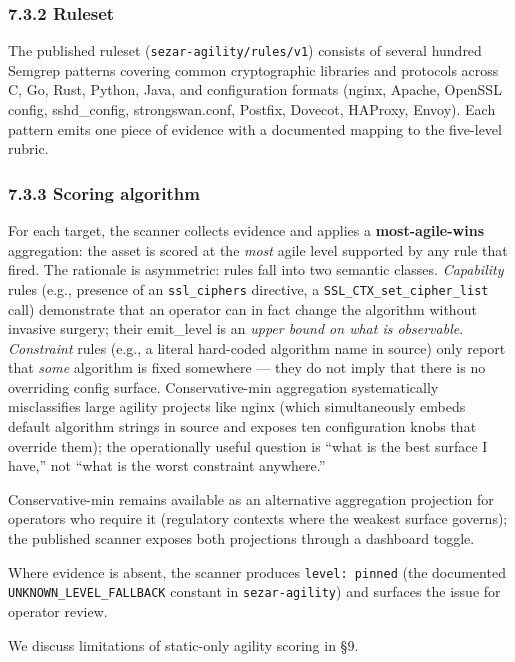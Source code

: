 \subsubsection{7.3.2 Ruleset}\label{ruleset}

The published ruleset (\texttt{sezar-agility/rules/v1}) consists of
several hundred Semgrep patterns covering common cryptographic libraries
and protocols across C, Go, Rust, Python, Java, and configuration
formats (nginx, Apache, OpenSSL config, sshd\_config, strongswan.conf,
Postfix, Dovecot, HAProxy, Envoy). Each pattern emits one piece of
evidence with a documented mapping to the five-level rubric.

\subsubsection{7.3.3 Scoring algorithm}\label{scoring-algorithm}

For each target, the scanner collects evidence and applies a
\textbf{most-agile-wins} aggregation: the asset is scored at the
\emph{most} agile level supported by any rule that fired. The rationale
is asymmetric: rules fall into two semantic classes. \emph{Capability}
rules (e.g., presence of an \texttt{ssl\_ciphers} directive, a
\texttt{SSL\_CTX\_set\_cipher\_list} call) demonstrate that an operator
can in fact change the algorithm without invasive surgery; their
emit\_level is an \emph{upper bound on what is observable}.
\emph{Constraint} rules (e.g., a literal hard-coded algorithm name in
source) only report that \emph{some} algorithm is fixed somewhere ---
they do not imply that there is no overriding config surface.
Conservative-min aggregation systematically misclassifies large agility
projects like nginx (which simultaneously embeds default algorithm
strings in source and exposes ten configuration knobs that override
them); the operationally useful question is ``what is the best surface I
have,'' not ``what is the worst constraint anywhere.''

Conservative-min remains available as an alternative aggregation
projection for operators who require it (regulatory contexts where the
weakest surface governs); the published scanner exposes both projections
through a dashboard toggle.

Where evidence is absent, the scanner produces \texttt{level:\ pinned}
(the documented \texttt{UNKNOWN\_LEVEL\_FALLBACK} constant in
\texttt{sezar-agility}) and surfaces the issue for operator review.

We discuss limitations of static-only agility scoring in §9.

